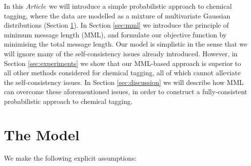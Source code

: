\documentclass{aastex61}
\newcommand{\article}{\emph{Article}}
\begin{document}
In this \article\ we will introduce a simple probabilistic approach to
chemical tagging, where the data are modelled as a mixture of multivariate
Gaussian distributions (Section \ref{sec:the-model}). In Section \ref{sec:mml}
we introduce the principle of minimum message length (MML), and formulate our
objective function by minimising the total message length. Our model is
simplistic in the sense that we will ignore many of the self-consistency
issues already introduced. However, in Section \ref{sec:experiments} we show
that our MML-based approach is superior to all other methods considered for
chemical tagging, all of which cannot alleviate the self-consistency issues.
In Section \ref{sec:discussion} we will describe how MML can overcome these
aforementioned issues, in order to construct a fully-consistent probabilistic
approach to chemical tagging.



\section{The Model}
\label{sec:the-model}

We make the following explicit assumptions:
\end{document}
